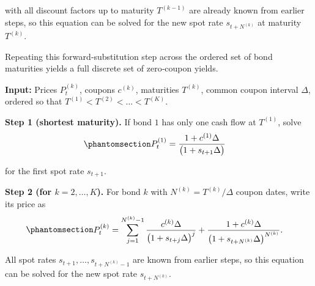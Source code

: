 \documentclass[
  letterpaper,
  DIV=11,
  numbers=noendperiod]{scrreprt}
\begin{document}
with all discount factors up to maturity \(T^{(k-1)}\) are already known
from earlier steps, so this equation can be solved for the new spot rate
\(s_{t+N^{(k)}}\) at maturity \(T^{(k)}\).

Repeating this forward‑substitution step across the ordered set of bond
maturities yields a full discrete set of zero‑coupon yields.

\begin{tcolorbox}[enhanced jigsaw, arc=.35mm, bottomrule=.15mm, bottomtitle=1mm, breakable, colback=white, colbacktitle=quarto-callout-note-color!10!white, colframe=quarto-callout-note-color-frame, coltitle=black, left=2mm, leftrule=.75mm, opacityback=0, opacitybacktitle=0.6, rightrule=.15mm, title=\textcolor{quarto-callout-note-color}{\faInfo}\hspace{0.5em}{Note}, titlerule=0mm, toprule=.15mm, toptitle=1mm]

\textbf{Input:} Prices \(P_t^{(k)}\), coupons \(c^{(k)}\), maturities
\(T^{(k)}\), common coupon interval \(\Delta\), ordered so that
\(T^{(1)}<T^{(2)}<\dots<T^{(K)}\).

\textbf{Step 1 (shortest maturity).} If bond \(1\) has only one cash
flow at \(T^{(1)}\), solve
\begin{equation}\protect\phantomsection\label{eq-gen-0034}{  
\begin{align}
    P_t^{(1)}  &= \frac{1 + c^{(1)}\Delta}{\bigl(1+s_{t+1}\Delta\bigr)}
\end{align}
}\end{equation}

for the first spot rate \(s_{t+1}\).

\textbf{Step 2 (for \(k=2,\dots,K\)).} For bond \(k\) with
\(N^{(k)} = T^{(k)}/\Delta\) coupon dates, write its price as
\begin{equation}\protect\phantomsection\label{eq-gen-0035}{  
\begin{align}
    P_t^{(k)}
      &= \sum_{j=1}^{N^{(k)}-1} 
          \frac{c^{(k)}\Delta}{\bigl(1+s_{t+j}\Delta\bigr)^{j}}
          + \frac{1 + c^{(k)}\Delta}
                 {\bigl(1+s_{t+N^{(k)}}\Delta\bigr)^{N^{(k)}}}.
\end{align}
}\end{equation}

All spot rates \(s_{t+1},\dots,s_{t+N^{(k)}-1}\) are known from earlier
steps, so this equation can be solved for the new spot rate
\(s_{t+N^{(k)}}\).

\end{tcolorbox}
\end{document}
